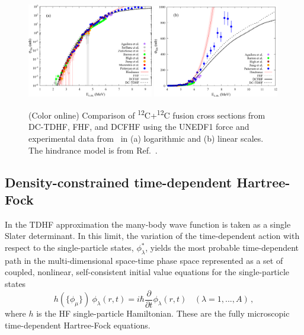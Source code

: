 \begin{figure}
	\includegraphics[width=0.49\textwidth]{../Figures/CrossSections.pdf}
	\includegraphics[width=0.49\textwidth]{../Figures/CrossSectionsLinear.pdf}
	\caption{(Color online) Comparison of \textsuperscript{12}C+\textsuperscript{12}C fusion cross sections from DC-TDHF, FHF, and DCFHF using the UNEDF1 force and experimental data from~\protect\cite{aguilera2006,spillane2007,zickefoose2011,barron-palos2006,high1977,jiang2018,mazarakis1973,patterson1969} in (a) logarithmic and (b) linear scales. The hindrance model is from Ref.~\protect\cite{jiang2007}.}
	\label{fig:xsec}
\end{figure}
\subsection{Density-constrained time-dependent Hartree-Fock}
\label{sec:dctdhf}


In the TDHF approximation the many-body wave function is taken as a single
Slater determinant.
In this limit, the variation of the time-dependent action with respect to the single-particle states, $\phi^{*}_{\lambda}$, yields the most probable time-dependent path
in the multi-dimensional space-time phase space represented as a
set of coupled, nonlinear, self-consistent initial value equations
for the single-particle states
\begin{equation}
h(\{\phi_{\mu}\}) \ \phi_{\lambda} (r,t) = i \hbar \frac{\partial}{\partial t} \phi_{\lambda} (r,t)
\ \ \ \ (\lambda = 1,...,A)\,,
\label{eq:TDHF}
\end{equation}
where $h$ is the HF single-particle Hamiltonian.
These are the fully microscopic time-dependent Hartree-Fock equations.


